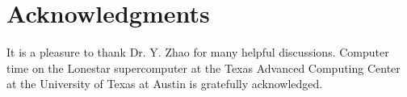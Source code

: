 \documentclass[reprint,superscriptaddress]{revtex4-1}
\begin{document}
\section{Acknowledgments}





It is a pleasure to thank Dr. Y. Zhao
for many helpful discussions.
%
Computer time on the Lonestar supercomputer
at the Texas Advanced Computing Center
at the University of Texas at Austin
is gratefully acknowledged.




\end{document}
